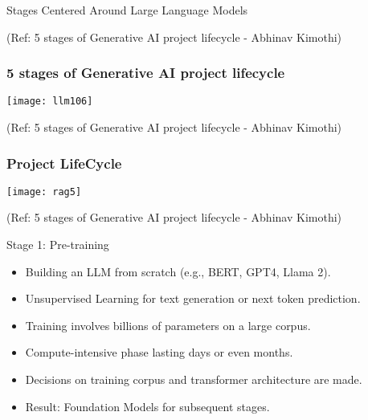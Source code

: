 
\begin{frame}[fragile]\frametitle{}
\begin{center}
{\Large  Stages Centered Around Large Language Models}

{\tiny (Ref: 5 stages of Generative AI project lifecycle - Abhinav Kimothi)}

\end{center}
\end{frame}

\begin{frame}[fragile]\frametitle{5 stages of Generative AI project lifecycle}


		\begin{center}
		\texttt{[image: llm106]}
		\end{center}

{\tiny (Ref: 5 stages of Generative AI project lifecycle - Abhinav  Kimothi)}

\end{frame}


\begin{frame}[fragile]\frametitle{Project LifeCycle}


		\begin{center}
		\texttt{[image: rag5]}
		\end{center}

{\tiny (Ref: 5 stages of Generative AI project lifecycle - Abhinav  Kimothi)}

\end{frame}


\begin{frame}[fragile]{Stage 1: Pre-training}
    \begin{itemize}
        \item Building an LLM from scratch (e.g., BERT, GPT4, Llama 2).
        \item Unsupervised Learning for text generation or next token prediction.
        \item Training involves billions of parameters on a large corpus.
        \item Compute-intensive phase lasting days or even months.
        \item Decisions on training corpus and transformer architecture are made.
        \item Result: Foundation Models for subsequent stages.
    \end{itemize}
\end{frame}

